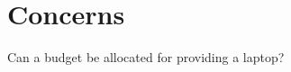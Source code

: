 \documentclass{article}
\begin{document}
\section{Concerns}
Can a budget be allocated for providing a laptop?



\end{document}
